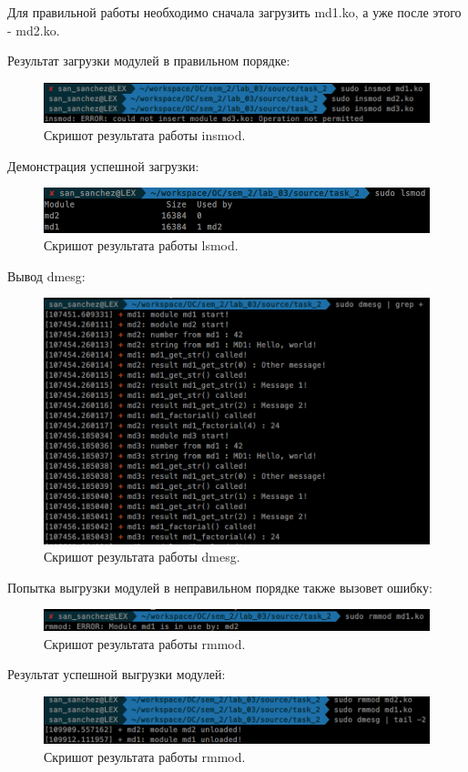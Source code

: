 Для правильной работы необходимо сначала загрузить md1.ko, а уже после этого - md2.ko.

Результат загрузки модулей в правильном порядке:

\begin{figure}[H]
    \centering
    \includegraphics[scale=0.5]{data/image/task_2_3.png}
    \caption{Скришот результата работы insmod.}
\end{figure}

Демонстрация успешной загрузки:

\begin{figure}[H]
    \centering
    \includegraphics[scale=0.6]{data/image/task_2_4.png}
    \caption{Скришот результата работы lsmod.}
\end{figure}

Вывод dmesg:

\begin{figure}[H]
    \centering
    \includegraphics[scale=0.5]{data/image/task_2_5.png}
    \caption{Скришот результата работы dmesg.}
\end{figure}

Попытка выгрузки модулей в неправильном порядке также вызовет ошибку:

\begin{figure}[H]
    \centering
    \includegraphics[scale=0.5]{data/image/task_2_6.png}
    \caption{Скришот результата работы rmmod.}
\end{figure}

Результат успешной выгрузки модулей:

\begin{figure}[H]
    \centering
    \includegraphics[scale=0.5]{data/image/task_2_7.png}
    \caption{Скришот результата работы rmmod.}
\end{figure}


